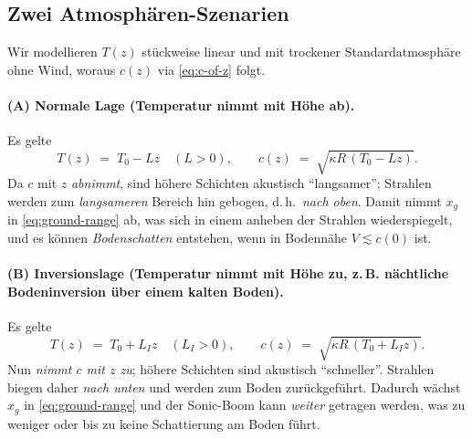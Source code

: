 \subsection{Zwei Atmosphären-Szenarien}
Wir modellieren $T(z)$ stückweise linear und mit trockener
Standardatmosphäre ohne Wind, woraus $c(z)$ via \eqref{eq:c-of-z} folgt.

\paragraph{(A) Normale Lage (Temperatur nimmt mit Höhe ab).}
Es gelte
\begin{equation}
    T(z) \;=\; T_0 - Lz \quad (L>0),
    \qquad
    c(z) \;=\; \sqrt{\kappa R\,(T_0 - Lz)} .
    \label{eq:normal-lapse}
\end{equation}
Da $c$ mit $z$ \emph{abnimmt}, sind höhere Schichten akustisch
``langsamer''; Strahlen werden zum \emph{langsameren} Bereich hin
gebogen, d.\,h.\ \emph{nach oben}.
Damit nimmt $x_g$ in \eqref{eq:ground-range} ab, was sich in einem anheben
der Strahlen wiederspiegelt, und es können \emph{Bodenschatten}
entstehen, wenn in Bodennähe $V\lesssim c(0)$ ist.

\paragraph{(B) Inversionslage (Temperatur nimmt mit Höhe zu, z.\,B.
nächtliche Bodeninversion über einem kalten Boden).}
Es gelte
\begin{equation}
    T(z) \;=\; T_0 + L_{I} z \quad (L_{I}>0),
    \qquad
    c(z) \;=\; \sqrt{\kappa R\,(T_0 + L_{I} z)} .
    \label{eq:inversion}
\end{equation}
Nun \emph{nimmt $c$ mit $z$ zu}; höhere Schichten sind akustisch ``schneller''.
Strahlen biegen daher \emph{nach unten} und werden zum Boden zurückgeführt.
Dadurch wächst $x_g$ in \eqref{eq:ground-range} und der Sonic-Boom
kann \emph{weiter} getragen werden, was zu weniger oder bis zu keine
Schattierung am Boden führt.


